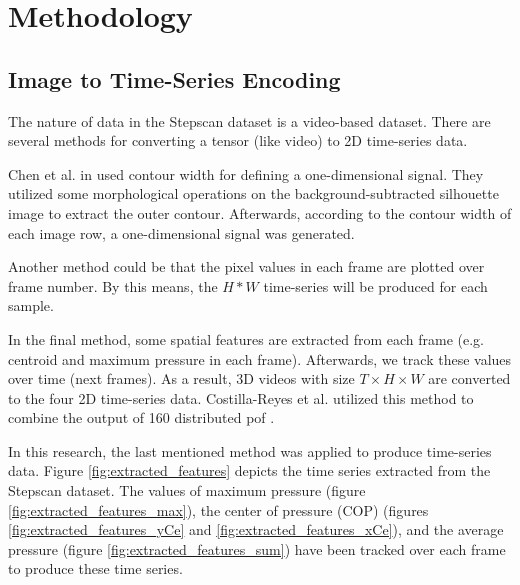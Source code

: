 
\section{Methodology}
\subsection{Image to Time-Series Encoding}
The nature of data in the Stepscan dataset is a video-based dataset. There are several methods for converting a tensor (like video) to 2D time-series data. 

Chen et al. in \cite{Chen2006GaitModel} used contour width for defining a one-dimensional signal. They utilized some morphological operations on the background-subtracted silhouette image to extract the outer contour. Afterwards, according to the contour width of each image row, a one-dimensional signal was generated.

Another method could be that the pixel values in each frame are plotted over frame number. By this means, the $H * W$ time-series will be produced for each sample.

In the final method, some spatial features are extracted from each frame (e.g. centroid and maximum pressure in each frame). Afterwards, we track these values over time (next frames). As a result, 3D videos with size $T \times H \times W$ are converted to the four 2D time-series data. Costilla-Reyes et al. utilized this method to combine the output of 160 distributed \acrshort{pof} \cite{Costilla-Reyes2018DeepSensors}.

In this research, the last mentioned method was applied to produce time-series data. Figure \ref{fig:extracted_features} depicts the time series extracted from the Stepscan dataset. %
The values of maximum pressure (figure \ref{fig:extracted_features_max}), the center of pressure (COP) (figures \ref{fig:extracted_features_yCe} and \ref{fig:extracted_features_xCe}), and the average pressure (figure \ref{fig:extracted_features_sum}) have been tracked over each frame to produce these time series. 


